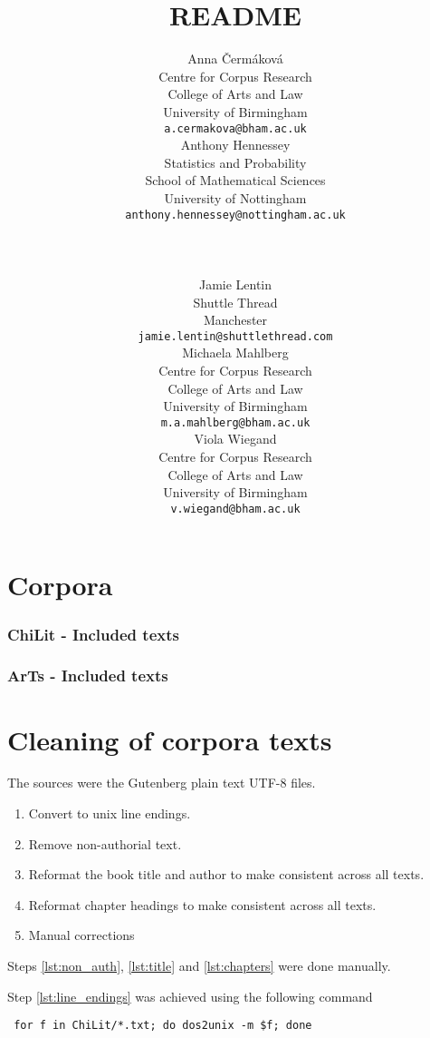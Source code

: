 \documentclass[a4paper,10pt]{paper}
\date{}
\author{
    \scriptsize
    \parbox{0.25\textwidth}{
       \small
       Anna Čermáková \\
       \scriptsize
       Centre for Corpus Research\\ College of Arts and Law\\ University of Birmingham\\
       \texttt{a.cermakova@bham.ac.uk}
    }
    \parbox{0.30\textwidth}{
        \small Anthony Hennessey \\
        \scriptsize
        Statistics and Probability\\ School of Mathematical Sciences\\ University of Nottingham \\
        \texttt{anthony.hennessey@nottingham.ac.uk}
    }
    \\ \\
    \parbox{0.30\textwidth}{
       \small
       Jamie Lentin \\
       \scriptsize
       Shuttle Thread\\ Manchester \\
       \texttt{jamie.lentin@shuttlethread.com}
    }
    \parbox{0.25\textwidth}{
       \small
       Michaela Mahlberg \\
       \scriptsize
       Centre for Corpus Research\\ College of Arts and Law\\ University of Birmingham \\
       \texttt{m.a.mahlberg@bham.ac.uk}
    }
    \parbox{0.25\textwidth}{
       \small
       Viola Wiegand \\
       \scriptsize
       Centre for Corpus Research\\ College of Arts and Law\\ University of Birmingham \\
       \texttt{v.wiegand@bham.ac.uk}
    }
}
\title{README}
\begin{document}
\nocite{*}

\maketitle

\tableofcontents

\section{Corpora}

\printbibliography[heading=none,keyword=corpus]

\subsubsection{ChiLit - Included texts}

\printbibliography[heading=none,keyword=ChiLit]

\subsubsection{ArTs - Included texts}

\printbibliography[heading=none,keyword=ArTs]

\section{Cleaning of corpora texts} \label{se:cleaning}
The sources were the Gutenberg plain text UTF-8 files.

\begin{enumerate}
    \item \label{lst:line_endings} Convert to unix line endings.
    \item \label{lst:non_auth} Remove non-authorial text.
    \item \label{lst:title} Reformat the book title and author to make consistent across all texts. 
    \item \label{lst:chapters} Reformat chapter headings to make consistent across all texts. 
    \item \label{lst:manual} Manual corrections
\end{enumerate}

Steps \ref{lst:non_auth}, \ref{lst:title} and \ref{lst:chapters} were done manually.

Step \ref{lst:line_endings} was achieved using the following command
\begin{verbatim} for f in ChiLit/*.txt; do dos2unix -m $f; done \end{verbatim}
\end{document}
